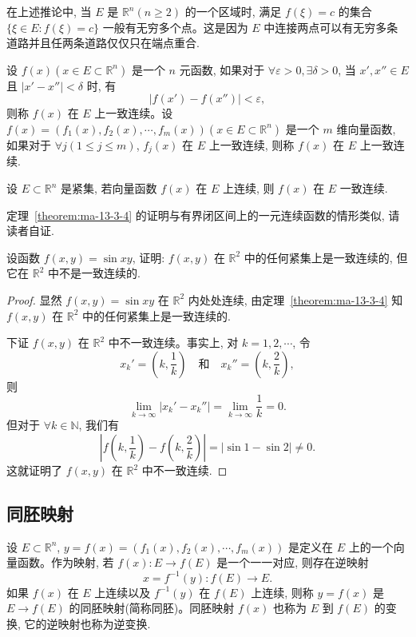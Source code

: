 在上述推论中, 当 $E$ 是 $\mathbb R^n(n\geqslant2)$ 的一个区域时, 满足 $f(\xi)=c$ 的集合 $\{\xi\in E:f(\xi)=c\}$ 一般有无穷多个点。这是因为 $E$ 中连接两点可以有无穷多条道路并且任两条道路仅仅只在端点重合.

设 $f(x)(x\in E\subset\mathbb R^n)$ 是一个 $n$ 元函数, 如果对于 $\forall\varepsilon>0,\exists\delta>0$, 当 $x',x''\in E$ 且 $|x'-x''|<\delta$ 时, 有
\[
  |f(x')-f(x'')|<\varepsilon,
\]
则称 $f(x)$ 在 $E$ 上一致连续。设 $f(x)=(f_1(x),f_2(x),\cdots,f_m(x))(x\in E\subset\mathbb R^n)$ 是一个 $m$ 维向量函数, 如果对于 $\forall j(1\leqslant j\leqslant m)$, $f_j(x)$ 在 $E$ 上一致连续, 则称 $f(x)$ 在 $E$ 上一致连续.

\begin{theorem}\label{theorem:ma-13-3-4}
设 $E\subset\mathbb R^n$ 是紧集, 若向量函数 $f(x)$ 在 $E$ 上连续, 则 $f(x)$ 在 $E$ 一致连续.
\end{theorem}

定理~\ref{theorem:ma-13-3-4} 的证明与有界闭区间上的一元连续函数的情形类似, 请读者自证.

\begin{example}\label{example:ma-13-3-3}
设函数 $f(x,y)=\sin xy$, 证明: $f(x,y)$ 在 $\mathbb R^2$ 中的任何紧集上是一致连续的, 但它在 $\mathbb R^2$ 中不是一致连续的.
\end{example}


\begin{proof}
显然 $f(x,y)=\sin xy$ 在 $\mathbb R^2$ 内处处连续, 由定理~\ref{theorem:ma-13-3-4} 知 $f(x,y)$ 在 $\mathbb R^2$ 中的任何紧集上是一致连续的.

下证 $f(x,y)$ 在 $\mathbb R^2$ 中不一致连续。事实上, 对 $k=1,2,\cdots$, 令
\[
  x_k'=\left(k,\frac1k\right)\quad\text{和}\quad
  x_k''=\left(k,\frac2k\right),
\]
则
\[
  \lim_{k\to\infty}|x_k'-x_k''|=\lim_{k\to\infty}\frac1k=0.
\]
但对于 $\forall k\in\mathbb N$, 我们有
\[
  \left|f\left(k,\frac1k\right)-f\left(k,\frac2k\right)\right|
  =|\sin1-\sin2|\ne0.
\]
这就证明了 $f(x,y)$ 在 $\mathbb R^2$ 中不一致连续.
\end{proof}


\subsection{同胚映射}
\label{subsec:ma-13-3-5}

设 $E\subset\mathbb R^n$, $y=f(x)=(f_1(x),f_2(x),\cdots,f_m(x))$ 是定义在 $E$ 上的一个向量函数。作为映射, 若 $f(x):E\to f(E)$ 是一个一一对应, 则存在逆映射
\[
  x=f^{-1}(y):f(E)\to E.
\]
如果 $f(x)$ 在 $E$ 上连续以及 $f^{-1}(y)$ 在 $f(E)$ 上连续, 则称 $y=f(x)$ 是 $E\to f(E)$ 的同胚映射(简称同胚)。同胚映射 $f(x)$ 也称为 $E$ 到 $f(E)$ 的变换, 它的逆映射也称为逆变换.

